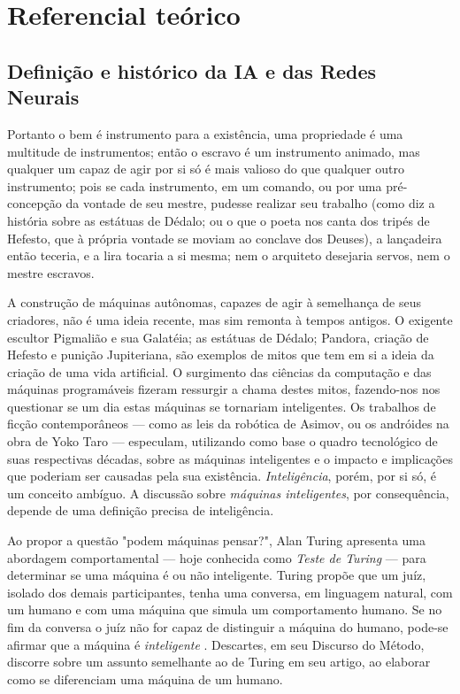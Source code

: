 \documentclass[12pt, a4paper]{article}
\begin{document}
\section{Referencial teórico}
\subsection{Definição e histórico da IA e das Redes Neurais}
\begin{displayquote}
Portanto o bem é instrumento para a existência, uma propriedade é uma multitude de instrumentos; então o escravo é um instrumento animado,
mas qualquer um capaz de agir por si só é mais valioso do que qualquer outro instrumento; pois se cada instrumento, em um comando,
ou por uma pré-concepção da vontade de seu mestre, pudesse realizar seu trabalho (como diz a história sobre as estátuas de Dédalo; ou o que
o poeta nos canta dos tripés de Hefesto, que à própria vontade se moviam ao conclave dos Deuses), a lançadeira então teceria, e a lira
tocaria a si mesma; nem o arquiteto desejaria servos, nem o mestre escravos. \cite{aristotle_politics}
\end{displayquote}

A construção de máquinas autônomas, capazes de agir à semelhança de seus criadores, não é uma ideia recente, mas sim remonta à tempos antigos. 
O exigente escultor Pigmalião e sua Galatéia; as estátuas de Dédalo; Pandora, criação de Hefesto e punição Jupiteriana, 
são exemplos de mitos que tem em si a ideia da criação de uma vida artificial. 
O surgimento das ciências da computação e das máquinas programáveis fizeram ressurgir a chama destes mitos, 
fazendo-nos nos questionar se um dia estas máquinas se tornariam inteligentes.
Os trabalhos de ficção contemporâneos --- como as leis da robótica de Asimov, ou os andróides na obra de Yoko Taro --- especulam, utilizando como base o quadro tecnológico de suas respectivas décadas, sobre as máquinas inteligentes e o impacto e implicações que poderiam ser causadas pela sua existência. 
 \emph{Inteligência}, porém, por si só, é um conceito ambíguo.
A discussão sobre \emph{máquinas inteligentes}, por consequência, depende de uma definição precisa de inteligência.

Ao propor a questão "podem máquinas pensar?", Alan Turing apresenta uma abordagem comportamental --- hoje conhecida como \emph{Teste de Turing} ---
para determinar se uma máquina é ou não inteligente. Turing propõe que um juíz, isolado dos demais participantes,
tenha uma conversa, em linguagem natural, com um humano e com uma máquina que simula um comportamento humano.
Se no fim da conversa o juíz não for capaz de distinguir a máquina do humano, pode-se afirmar que a máquina é \emph{inteligente}
\cite{turing}. Descartes, em seu Discurso do Método, discorre sobre um assunto semelhante ao de Turing em seu artigo, ao elaborar como se diferenciam
uma máquina de um humano.
\end{document}
